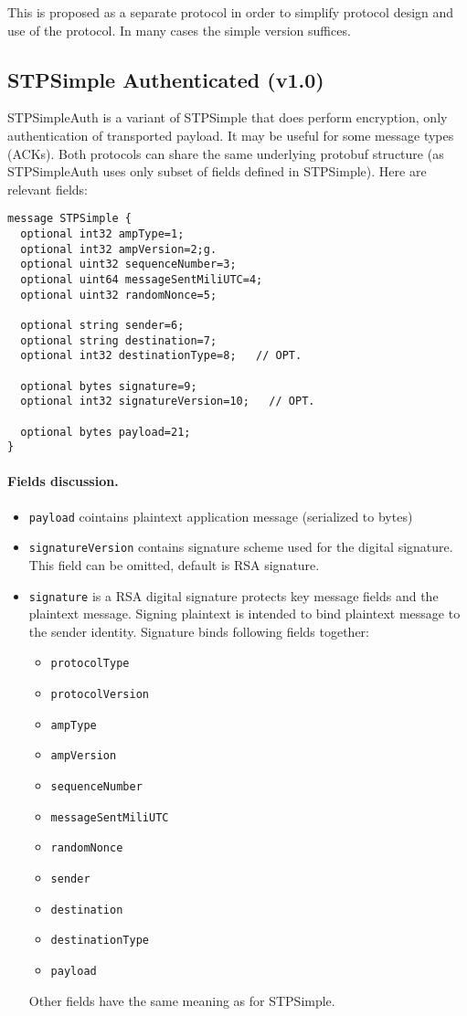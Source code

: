 \documentclass[a4paper,10pt]{article}
\begin{document}
This is proposed as a separate protocol in order to simplify protocol design and use of the protocol.
In many cases the simple version suffices.

\subsection{STPSimple Authenticated (v1.0)}
STPSimpleAuth is a variant of STPSimple that does perform encryption, only authentication of transported payload. It may be useful for some message types (ACKs).
Both protocols can share the same underlying protobuf structure (as STPSimpleAuth uses only subset of fields defined in STPSimple). Here are relevant fields:

\begin{Verbatim}[frame=single]
message STPSimple {
  optional int32 ampType=1;
  optional int32 ampVersion=2;g.
  optional uint32 sequenceNumber=3;
  optional uint64 messageSentMiliUTC=4;
  optional uint32 randomNonce=5;
  
  optional string sender=6;
  optional string destination=7; 
  optional int32 destinationType=8;   // OPT. 
  
  optional bytes signature=9;
  optional int32 signatureVersion=10;   // OPT.
  
  optional bytes payload=21;
}
\end{Verbatim} 

\paragraph{Fields discussion.} 
\begin{itemize}
 \item \verb#payload# cointains plaintext application message (serialized to bytes)

 \item \verb#signatureVersion# contains signature scheme used for the digital signature. This field can be omitted, default is RSA signature.
 
 \item \verb#signature# is a RSA digital signature protects key message fields and the plaintext message. Signing plaintext 
 is intended to bind plaintext message to the sender identity. Signature binds following fields together:
\begin{itemize}
 \item \verb#protocolType#
 \item \verb#protocolVersion#
 \item \verb#ampType#
 \item \verb#ampVersion#
 \item \verb#sequenceNumber#
 \item \verb#messageSentMiliUTC# 
 \item \verb#randomNonce#
 \item \verb#sender#
 \item \verb#destination#
 \item \verb#destinationType#
 \item \verb#payload#
\end{itemize}

Other fields have the same meaning as for STPSimple.
\end{itemize}
\end{document}
